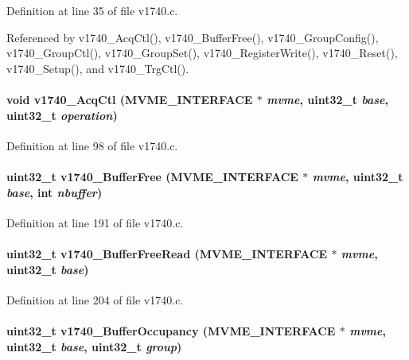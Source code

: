 Definition at line 35 of file v1740.c.

Referenced by v1740\_\-AcqCtl(), v1740\_\-BufferFree(), v1740\_\-GroupConfig(), v1740\_\-GroupCtl(), v1740\_\-GroupSet(), v1740\_\-RegisterWrite(), v1740\_\-Reset(), v1740\_\-Setup(), and v1740\_\-TrgCtl().
\paragraph[{v1740\_\-AcqCtl}]{\setlength{\rightskip}{0pt plus 5cm}void v1740\_\-AcqCtl ({\bf MVME\_\-INTERFACE} $\ast$ {\em mvme}, \/  uint32\_\-t {\em base}, \/  uint32\_\-t {\em operation})}\hfill\label{v1740_8c_a104acdee75049a0dc8393eb047c5fa11}


Definition at line 98 of file v1740.c.
\paragraph[{v1740\_\-BufferFree}]{\setlength{\rightskip}{0pt plus 5cm}uint32\_\-t v1740\_\-BufferFree ({\bf MVME\_\-INTERFACE} $\ast$ {\em mvme}, \/  uint32\_\-t {\em base}, \/  int {\em nbuffer})}\hfill\label{v1740_8c_aac2f1a0ff0d9d81afe98cfe0f6837c45}


Definition at line 191 of file v1740.c.
\paragraph[{v1740\_\-BufferFreeRead}]{\setlength{\rightskip}{0pt plus 5cm}uint32\_\-t v1740\_\-BufferFreeRead ({\bf MVME\_\-INTERFACE} $\ast$ {\em mvme}, \/  uint32\_\-t {\em base})}\hfill\label{v1740_8c_a77ab5a5ee13dc62e36b948c637a5cdda}


Definition at line 204 of file v1740.c.
\paragraph[{v1740\_\-BufferOccupancy}]{\setlength{\rightskip}{0pt plus 5cm}uint32\_\-t v1740\_\-BufferOccupancy ({\bf MVME\_\-INTERFACE} $\ast$ {\em mvme}, \/  uint32\_\-t {\em base}, \/  uint32\_\-t {\em group})}\hfill\label{v1740_8c_ab09f1a9680e515f1c4a37756d889fb50}


